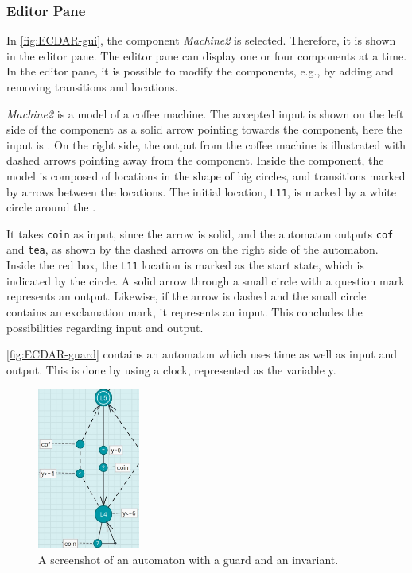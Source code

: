 \subsubsection{Editor Pane}
In \autoref{fig:ECDAR-gui}, the component \textit{Machine2} is selected. Therefore, it is shown in the editor pane. The editor pane can display one or four components at a time.
In the editor pane, it is possible to modify the components, e.g., by adding and removing transitions and locations.


\textit{Machine2} is a model of a coffee machine. The accepted input is shown on the left side of the component as a solid arrow pointing towards the component, here the input is . On the right side, the output from the coffee machine is illustrated with dashed arrows pointing away from the component. 
Inside the component, the model is composed of locations in the shape of big circles, and transitions marked by arrows between the locations. The initial location, \texttt{L11}, is marked by a white circle around the . 


It takes \texttt{coin} as input, since the arrow is solid, and the automaton outputs \texttt{cof} and \texttt{tea}, as shown by the dashed arrows on the right side of the automaton.
Inside the red box, the \texttt{L11} location is marked as the start state, which is indicated by the circle.
A solid arrow through a small circle with a question mark represents an output. 
Likewise, if the arrow is dashed and the small circle contains an exclamation mark, it represents an input.
This concludes the possibilities regarding input and output.

\autoref{fig:ECDAR-guard} contains an automaton which uses time as well as input and output.
This is done by using a clock, represented as the variable y.
\begin{figure}[H]
    \centering
    \includegraphics[width=0.3\textwidth]{common/figures/ecdar-guards.jpg}
    \caption{A screenshot of an automaton with a guard and an invariant.}
    \label{fig:ECDAR-guard}
\end{figure}

